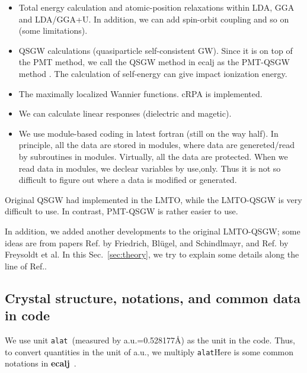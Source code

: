 \documentclass[a4paper,10pt,fleqn]{article}
\newcommand{\raw}[1]{{\tt #1}}
\newcommand{\ecalj}{{\bf ecalj}\ }
\newcommand{\alat}{{\raw{alat}}}
\begin{document}
\begin{itemize}
\item
Total energy calculation and atomic-position relaxations within LDA, GGA and LDA/GGA+U.
In addition, we can add spin-orbit coupling and so on (some limitations).

\item
QSGW calculations (quasiparticle self-consistent GW). 
Since it is on top of the PMT method, we call the
QSGW method in ecalj as the PMT-QSGW method \cite{kotani_quasiparticle_2014}. 
The calculation of self-energy can give impact ionization energy.

\item
The maximally localized Wannier functions. cRPA is implemented.

\item
We can calculate linear responses (dielectric and magetic).

\item
We use module-based coding in latest fortran (still on the way half).
In principle, all the data are stored in modules, 
where data are genereted/read by subroutines in modules.
Virtually, all the data are protected. 
When we read data in modules, we declear variables by use,only.
Thus it is not so difficult to figure out where a data is modified or generated.

\end{itemize}

Original QSGW had implemented in the LMTO\cite{kotani_quasiparticle_2007}, while
the LMTO-QSGW is very difficult to use. In contrast, PMT-QSGW is rather easier to use.

In addition, we added another developments to the original LMTO-QSGW; 
some ideas are from papers Ref.\cite{friedrich_efficient_2010} 
by Friedrich, Bl\"ugel, and Schindlmayr, and Ref.\cite{Freysoldt2007} by Freysoldt et al.
In this Sec.~\ref{sec:theory}, we try to explain some details along
the line of Ref.\cite{kotani_quasiparticle_2014}.


\subsection{Crystal structure, notations, and common data in code}
\label{how to represent crystalstructure and symmetry}
We use unit \alat\ (measured by a.u.=0.528177\AA) as the unit in the code.
Thus, to convert quantities in the unit of a.u., we multiply \alat\.
Here is some common notations in {\ecalj}.
\end{document}
